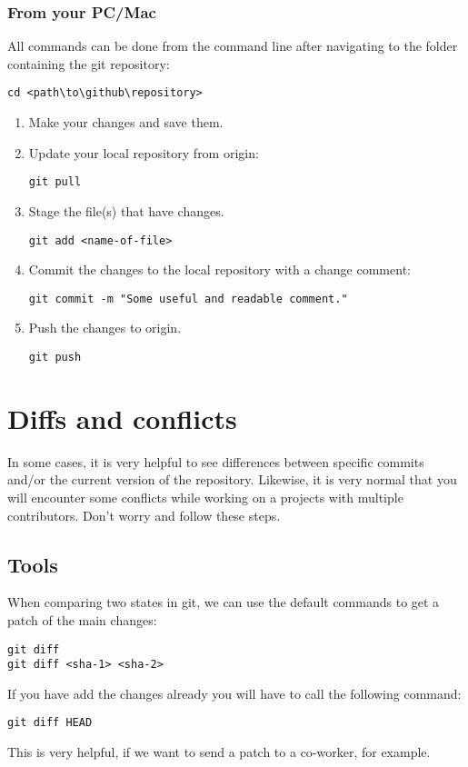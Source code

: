 \documentclass{report}
\begin{document}
\subsection{From your PC/Mac}
All commands can be done from the command line after navigating to the folder containing the git repository:
\begin{verbatim}
cd <path\to\github\repository>
\end{verbatim}

\begin{enumerate}[noitemsep]
    \item Make your changes and save them.
    \item Update your local repository from origin:
    \begin{verbatim}
git pull   
    \end{verbatim}
    \item Stage the file(s) that have changes.
    \begin{verbatim}
git add <name-of-file>
    \end{verbatim}
    \item Commit the changes to the local repository with a change comment:
    \begin{verbatim}
git commit -m "Some useful and readable comment."
    \end{verbatim}
    \item Push the changes to origin.
    \begin{verbatim}
git push
    \end{verbatim}
\end{enumerate}

\chapter{Diffs and conflicts}
In some cases, it is very helpful to see differences between specific commits and/or the current version of the repository.
Likewise, it is very normal that you will encounter some conflicts while working on a projects with multiple contributors. Don't worry and follow these steps.

\section{Tools}
When comparing two states in git, we can use the default commands to get a patch of the main changes:
\begin{verbatim}
git diff
git diff <sha-1> <sha-2>
\end{verbatim}
If you have add the changes already you will have to call the following command:
\begin{verbatim}
git diff HEAD
\end{verbatim}
This is very helpful, if we want to send a patch to a co-worker, for example.
\end{document}
